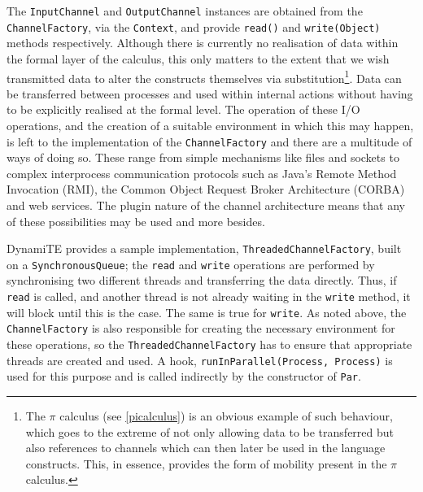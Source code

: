 The \texttt{InputChannel} and \texttt{OutputChannel} instances are
obtained from the \texttt{ChannelFactory}, via the \texttt{Context},
and provide \texttt{read()} and \texttt{write(Object)} methods
respectively.  Although there is currently no realisation of data
within the formal layer of the calculus, this only matters to the
extent that we wish transmitted data to alter the constructs
themselves via substitution\footnote{The $\pi$ calculus (see
  \ref{picalculus}) is an obvious example of such behaviour, which
  goes to the extreme of not only allowing data to be transferred but
  also references to channels which can then later be used in the
  language constructs.  This, in essence, provides the form of
  mobility present in the $\pi$ calculus.}.  Data can be transferred
between processes and used within internal actions without having to
be explicitly realised at the formal level.  The operation of these
I/O operations, and the creation of a suitable environment in which
this may happen, is left to the implementation of the
\texttt{ChannelFactory} and there are a multitude of ways of doing so.
These range from simple mechanisms like files and sockets to complex
interprocess communication protocols such as Java's Remote Method
Invocation (RMI), the Common Object Request Broker Architecture
(CORBA) and web services.  The plugin nature of the channel
architecture means that any of these possibilities may be used and
more besides.

DynamiTE provides a sample implementation,
\texttt{ThreadedChannelFactory}, built on a \texttt{SynchronousQueue};
the \texttt{read} and \texttt{write} operations are performed by
synchronising two different threads and transferring the data
directly.  Thus, if \texttt{read} is called, and another thread is not
already waiting in the \texttt{write} method, it will block until this
is the case.  The same is true for \texttt{write}.  As noted above,
the \texttt{ChannelFactory} is also responsible for creating the
necessary environment for these operations, so the
\texttt{ThreadedChannelFactory} has to ensure that appropriate threads
are created and used.  A hook, \texttt{runInParallel(Process,
  Process)} is used for this purpose and is called indirectly by the
constructor of \texttt{Par}.

